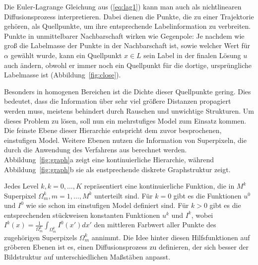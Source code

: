 Die Euler-Lagrange Gleichung aus (\ref{eq:lag1}) kann man auch als nichtlinearen Diffusionsprozess interpretieren.
Dabei dienen die Punkte, die zu einer Trajektorie gehören, als Quellpunkte, um ihre entsprechende Labelinformation zu verbreiten.
Punkte in unmittelbarer Nachbarschaft wirken wie Gegenpole:
Je nachdem wie groß die Labelmasse der Punkte in der Nachbarschaft ist, sowie welcher Wert für $\alpha$ gewählt wurde,
kann ein Quellpunkt $x \in L$ sein Label in der finalen Lösung $u$ auch ändern,
obwohl er immer noch ein Quellpunkt für die dortige, ursprüngliche Labelmasse ist (Abbildung~\ref{fig:close}).

Besonders in homogenen Bereichen ist die Dichte dieser Quellpunkte gering. Dies bedeutet, dass die Information über sehr viel größere Distanzen
propagiert werden muss, meistens behindert durch Rauschen und unwichtige Strukturen. Um dieses Problem zu lösen, soll nun ein mehrstufiges Model zum
Einsatz kommen. Die feinste Ebene dieser Hierarchie entspricht dem zuvor besprochenen, einstufigen Model. Weitere Ebenen nutzen die Information von
Superpixeln, die durch die Anwendung des Verfahrens aus \cite{001} berechnet werden.
Abbildung~\ref{fig:graph}a zeigt eine kontinuierliche Hierarchie, während
Abbildung~\ref{fig:graph}b sie als enstprechende diskrete Graphstruktur zeigt.

Jedes Level $k, k=0,\dotsc,K$ repräsentiert eine kontinuierliche Funktion, die in $M^k$ Superpixel $\Omega_m^k,m=1,\dotsc,M^k$ unterteilt sind.
Für $k=0$ gibt es die Funktionen $u^0$ und $I^0$ wie sie schon im einstufigen Model definiert sind.
Für $k>0$ gibt es die entsprechenden stückweisen konstanten
Funktionen $u^k$ und $I^k$, wobei $I^k(x) = \frac{1}{\Omega_m^k} \int_{\Omega_m^k}I^0(x')dx'$ den mittleren Farbwert aller Punkte des zugehörigen Superpixels
$\Omega_m^k$ annimmt. Die Idee hinter diesen Hilfsfunktionen auf gröberen Ebenen ist es, einen Diffusionsprozess zu definieren, der sich besser der
Bildstruktur auf unterschiedlichen Maßstäben anpasst.


